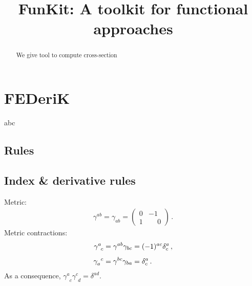 \documentclass[10pt,prd,nofootinbib,superscriptaddress,twocolumn]{revtex4-2}
\newcommand{\gettitle}{FunKit: A toolkit for functional approaches}
\begin{document}
\title{\gettitle}

\begin{abstract}

We give tool to compute cross-section
\end{abstract}

\maketitle


\section{FED\MakeLowercase{eri}K}

abc


\subsection{Rules}
\label{sec:rules}

\subsection{Index \& derivative rules}
\label{sec:rules_indicesDerivatives}

Metric:
%
\begin{align}
	\gamma^{ab}=\gamma_{ab} = \begin{pmatrix}
		0&-1\\
		1&\phantom{-}0
	\end{pmatrix}
	\,.
\end{align}
%
Metric contractions:
%
\begin{align}
	\gamma^{a}_{\phantom{a}c} &= \gamma^{ab}\gamma_{bc} = (-1)^{ac}\delta^a_c
	\,,\notag\\[1ex]
	\gamma_{a}^{\phantom{a}c} &= \gamma^{bc}\gamma_{ba} = \delta^a_c
	\,.
\end{align}
%
As a consequence, $\gamma^{a}_{\phantom{a}c}\gamma^{c}_{\phantom{c}d} = \delta^{ad}$.
\end{document}
